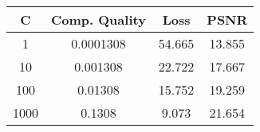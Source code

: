 \begin{table}
\begin{tabular}{cccc}\hline
C & Comp. Quality & Loss & PSNR \\\hline
1 & 0.0001308 & 54.665 & 13.855 \\\hline
10 & 0.001308 & 22.722 & 17.667 \\\hline
100 & 0.01308 & 15.752 & 19.259 \\\hline
1000 & 0.1308 & 9.073 & 21.654 \\\hline
\end{tabular}
\end{table}
